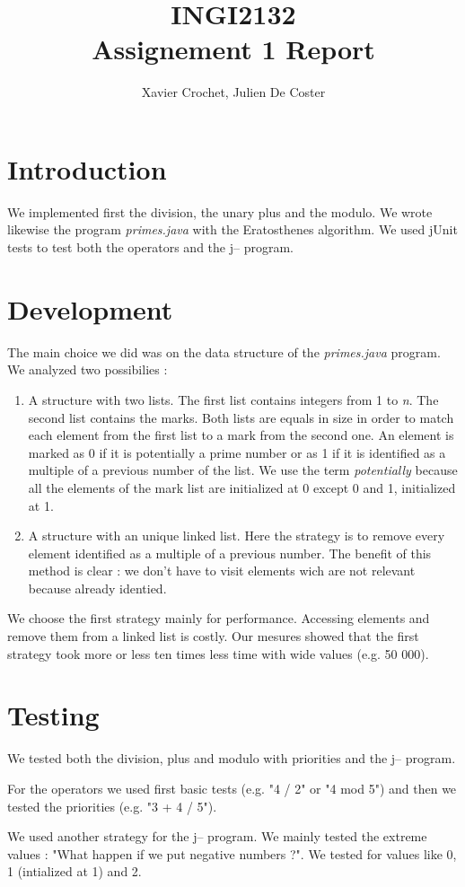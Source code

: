 \documentclass[10pt,a4paper]{article}
\author{Xavier Crochet, Julien De Coster}
\title{INGI2132 \\ Assignement 1 Report}
\begin{document}
\maketitle

\section{Introduction}

We implemented first the division, the unary plus and the modulo. We wrote likewise the program \emph{primes.java} with the Eratosthenes algorithm. We used jUnit tests to test both the operators and the j-- program.

\section{Development}

The main choice we did was on the data structure of the \emph{primes.java} program. We analyzed two possibilies :

\begin{enumerate}
\item A structure with two lists. The first list contains integers from 1 to \emph{n}. The second list contains the marks. Both lists are equals in size in order to match each element from the first list to a mark from the second one. An element is marked as 0 if it is potentially a prime number or as 1 if it is identified as a multiple of a previous number of the list. We use the term \emph{potentially} because all the elements of the mark list are initialized at 0 except 0 and 1, initialized at 1.

\item A structure with an unique linked list. Here the strategy is to remove every element identified as a multiple of a previous number. The benefit of this method is clear : we don't have to visit elements wich are not relevant because already identied.
\end{enumerate}

We choose the first strategy mainly for performance. Accessing elements and remove them from a linked list is costly. Our mesures showed that the first strategy took more or less ten times less time with wide values (e.g. 50 000).

\section{Testing}

We tested both the division, plus and modulo with priorities and the j-- program.

For the operators we used first basic tests (e.g. "4 / 2" or "4 mod 5") and then we tested the priorities (e.g. "3 + 4 / 5").

We used another strategy for the j-- program. We mainly tested the extreme values : "What happen if we put negative numbers ?". We tested for values like 0, 1 (intialized at 1) and 2.
\end{document}
